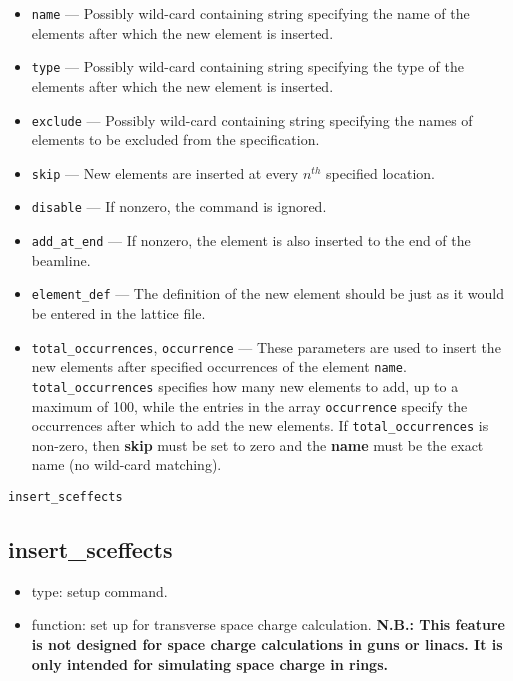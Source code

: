 \documentclass[11pt]{article}
\begin{document}
\begin{itemize}
\item \verb|name| --- Possibly wild-card containing string specifying the
   name of the elements after which the new element is inserted.
\item \verb|type| --- Possibly wild-card containing string specifying the
   type of the elements after which the new element is inserted.
\item \verb|exclude| --- Possibly wild-card containing string specifying 
   the names of elements to be excluded from the specification.
\item \verb|skip| --- New elements are inserted at every $n^{th}$ specified location.
\item \verb|disable| --- If nonzero, the command is ignored.
\item \verb|add_at_end| --- If nonzero, the element is also inserted to the end of the beamline.
\item \verb|element_def| --- The definition of the new element should be just as it would be entered in 
the lattice file.
\item \verb|total_occurrences|, \verb|occurrence| --- 
These parameters are used to insert the new elements after specified occurrences of 
the element \verb|name|.  \verb|total_occurrences| specifies how many new elements to add,
up to a maximum of 100, while the entries in the array \verb|occurrence| specify the occurrences
after which to add the new elements. If \verb|total_occurrences| is non-zero, then {\bf skip} must
be set to zero  and the {\bf name} must be the exact name (no wild-card matching). 
\end{itemize}

\begin{latexonly}
\newpage
\begin{center}{\Large\verb|insert_sceffects|}\end{center}
\end{latexonly}
\subsection{insert\_sceffects \label{subsec:insertsceffects}}

\begin{itemize}
\item type: setup command.
\item function: set up for transverse space charge calculation.  {\bf
N.B.: This feature is not designed for space charge calculations in
guns or linacs.  It is only intended for simulating space charge in
rings. }
\end{itemize}
\end{document}
